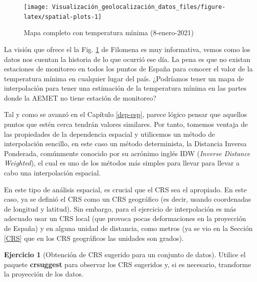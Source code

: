 \documentclass[
]{book}
\theoremstyle{definition}
\theoremstyle{definition}
\theoremstyle{definition}
\newtheorem{exercise}{Ejercicio}[chapter]
\theoremstyle{definition}
\theoremstyle{remark}
\begin{document}
\begin{figure}

{\centering \texttt{[image: Visualización\_geolocalización\_datos\_files/figure-latex/spatial-plots-1]} 

}

\caption{Mapa completo con temperatura mínima (8-enero-2021)}\label{fig:spatial-plots}
\end{figure}

La visión que ofrece el la Fig. \ref{fig:spatial-plots} de Filomena es muy
informativa, vemos como los datos nos cuentan la historia de lo que ocurrió ese
día. La pena es que no existan estaciones de monitoreo en todos los puntos de
España para conocer el valor de la temperatura mínima en cualquier lugar del
país. ¿Podríamos tener un mapa de interpolación para tener una estimación de la
temperatura mínima en las partes donde la AEMET no tiene estación de monitoreo?

Tal y como se avanzó en el Capítulo \ref{dep-esp}, parece lógico pensar que
aquellos puntos que estén cerca tendrán valores similares. Por tanto, tomemos
ventaja de las propiedades de la dependencia espacial y utilicemos un método de
interpolación sencillo, en este caso un método determinista, la Distancia
Inversa Ponderada, comúnmente conocido por su acrónimo inglés IDW (\emph{Inverse
Distance Weighted}), el cual es uno de los métodos más simples para llevar para
llevar a cabo una interpolación espacial.

En este tipo de análisis espacial, es crucial que el CRS sea el apropiado. En
este caso, ya se definió el CRS como un CRS geográfico (es decir, usando
coordenadas de longitud y latitud). Sin embargo, para el ejercicio de
interpolación es más adecuado usar un CRS local (que provoca pocas deformaciones
en la proyección de España) y en alguna unidad de distancia, como metros (ya se
vio en la Sección \ref{CRS} que en los CRS geográficos las unidades son
grados).

\begin{exercise}[Obtención de CRS sugerido para un conjunto de datos]
\protect\hypertarget{exr:ex11}{}\label{exr:ex11}Utilice el paquete \textbf{crsuggest} para observar los CRS sugeridos y, si es
necesario, transforme la proyección de los datos.
\end{exercise}
\end{document}
